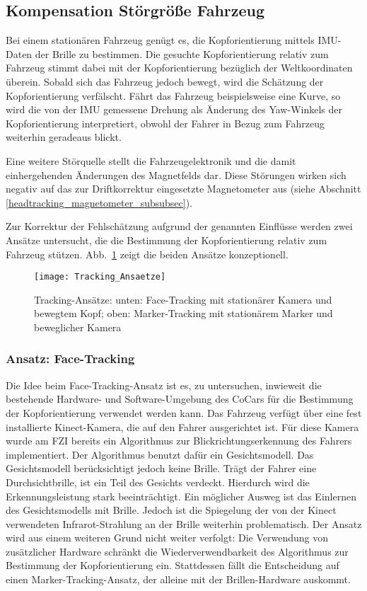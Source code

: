 
\subsection{Kompensation Störgröße Fahrzeug}
\label{headtracking_marker_subsec}

Bei einem stationären Fahrzeug genügt es, die Kopforientierung mittels \acs{IMU}-Daten der Brille zu bestimmen.
Die gesuchte Kopforientierung relativ zum Fahrzeug stimmt dabei mit der Kopforientierung bezüglich der Weltkoordinaten überein.
Sobald sich das Fahrzeug jedoch bewegt, wird die Schätzung der Kopforientierung verfälscht.
Fährt das Fahrzeug beispielsweise eine Kurve, so wird die von der IMU gemessene Drehung als Änderung des Yaw-Winkels der Kopforientierung interpretiert, obwohl der Fahrer in Bezug zum Fahrzeug weiterhin geradeaus blickt.

Eine weitere Störquelle stellt die Fahrzeugelektronik und die damit einhergehenden Änderungen des Magnetfelds dar.
Diese Störungen wirken sich negativ auf das zur Driftkorrektur eingesetzte Magnetometer aus (siehe Abschnitt \ref{headtracking_magnetometer_subsubsec}).

Zur Korrektur der Fehlschätzung aufgrund der genannten Einflüsse werden zwei Ansätze untersucht, die die Bestimmung der Kopforientierung relativ zum Fahrzeug stützen. Abb.~\ref{fig:tracking_ansaetze} zeigt die beiden Ansätze konzeptionell.

\begin{figure}[h]
  \centering
  \texttt{[image: Tracking\_Ansaetze]}
  \caption{Tracking-Ansätze: unten: Face-Tracking mit stationärer Kamera und bewegtem Kopf; oben: Marker-Tracking mit stationärem Marker und beweglicher Kamera }
  \label{fig:tracking_ansaetze}
\end{figure}


\subsubsection{Ansatz: Face-Tracking}
\label{headtracking_facetracking_subsubsec}

Die Idee beim Face-Tracking-Ansatz ist es, zu untersuchen, inwieweit die bestehende Hardware- und Software-Umgebung des CoCars für die Bestimmung der Kopforientierung verwendet werden kann.
Das Fahrzeug verfügt über eine fest installierte Kinect-Kamera, die auf den Fahrer ausgerichtet ist.
Für diese Kamera wurde am \ac{FZI} bereits ein Algorithmus zur Blickrichtungserkennung des Fahrers implementiert.
Der Algorithmus benutzt dafür ein Gesichtsmodell.
Das Gesichtsmodell berücksichtigt jedoch keine Brille.
Trägt der Fahrer eine Durchsichtbrille, ist ein Teil des Gesichts verdeckt.
Hierdurch wird die Erkennungsleistung stark beeinträchtigt.
Ein möglicher Ausweg ist das Einlernen des Gesichtsmodells mit Brille.
Jedoch ist die Spiegelung der von der Kinect verwendeten Infrarot-Strahlung an der Brille weiterhin problematisch.
Der Ansatz wird aus einem weiteren Grund nicht weiter verfolgt:
Die Verwendung von zusätzlicher Hardware schränkt die Wiederverwendbarkeit des Algorithmus zur Bestimmung der Kopforientierung ein.
Stattdessen fällt die Entscheidung auf einen Marker-Tracking-Ansatz, der alleine mit der Brillen-Hardware auskommt.


